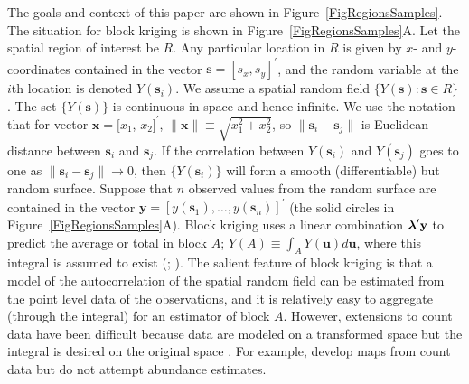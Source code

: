 \documentclass[12pt, titlepage]{article}\usepackage[]{graphicx}\usepackage[]{color}
\newcommand{\bx}{\ensuremath{\mathbf{x}}}
\newcommand{\bs}{\ensuremath{\mathbf{s}}}
\newcommand{\bu}{\ensuremath{\mathbf{u}}}
\def\bs{\mathbf{s}}
\def\bu{\mathbf{u}}
\def\by{\mathbf{y}}
\def\blambda{\mbox{\boldmath $\lambda$}}
\begin{document}
The goals and context of this paper are shown in Figure~\ref{FigRegionsSamples}. The situation for block kriging is shown in Figure~\ref{FigRegionsSamples}A.  Let the spatial region of interest be $R$. Any particular location in $R$ is given by $x$- and $y$-coordinates contained in the vector $\bs = [s_x,s_y]^\prime$, and the random variable at the $i$th location is denoted $Y(\bs_i)$. We assume a spatial random field $\{Y(\bs): \bs \in R\}$ \citep[pg. 30]{Cres:stat:1993}. The set $\{Y(\mathbf{s})\}$ is continuous in space and hence infinite.  We use the notation that for vector $\bx=[x_1$, $x_2]^\prime$, $\|\bx\| \equiv \sqrt{x_1^2 + x_2^2}$, so $\|\bs_i - \bs_j \|$ is Euclidean distance between $\bs_i$ and $\bs_j$. If the correlation between $Y(\mathbf{s}_i)$ and $Y(\mathbf{s}_j)$ goes to one as $\|\mathbf{s}_i - \mathbf{s}_j\| \rightarrow 0$, then $\{Y(\mathbf{s}_i)\}$ will form a smooth (differentiable) but random surface.  Suppose that $n$ observed values from the random surface are contained in the vector $\by = [y(\bs_1),\ldots,y(\bs_n)]^{\prime}$ (the solid circles in Figure~\ref{FigRegionsSamples}A). Block kriging uses a linear combination $\blambda^{\prime}\mathbf{y}$ to predict the average or total in block $A$; $Y(A) \equiv \int_A Y(\bu)d\bu$, where this integral is assumed to exist (\citealp[][pg. 23]{Yagl:intr:1962}; \citealp[][pg.106]{Cres:stat:1993}). The salient feature of block kriging is that a model of the autocorrelation of the spatial random field can be estimated from the point level data of the observations, and it is relatively easy to aggregate (through the integral) for an estimator of block $A$. However, extensions to count data have been difficult because data are modeled on a transformed space but the integral is desired on the original space \citep[e.g., see][p. 286]{Cres:stat:1993}.  For example, \citet*{Chri:Waag:baye:2002, Wikl:spat:2002, Mone:Dubr:Bonn:Durb:Guin:Geos:2006} develop maps from count data but do not attempt abundance estimates.                         
 
\end{document}
